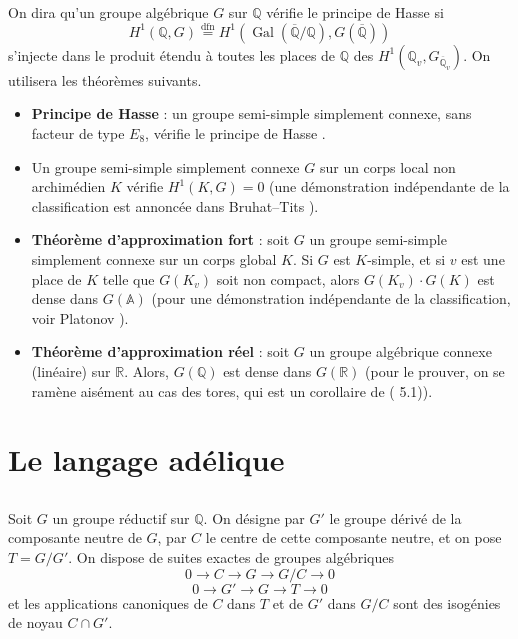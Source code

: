 \documentclass[11pt]{amsart}
\theoremstyle{plain}
\theoremstyle{definition}
\DeclareMathOperator{\Gal}{Gal}
\newcommand{\QQ}{\mathbb{Q}}
\newcommand{\RR}{\mathbb{R}}
\begin{document}
On dira qu'un groupe alg\'ebrique $G$ sur $\QQ$ v\'erifie le principe de Hasse si
\[
H^1(\QQ, G) \overset{\text{dfn}}{=} H^1(\Gal(\overline{\QQ}/\QQ), G(\overline{\QQ}))
\]
s'injecte dans le produit \'etendu \`a toutes les places de $\QQ$ des $H^1(\QQ_v, G_{\overline{\QQ}_v})$. On utilisera les th\'eor\`emes suivants.

\begin{itemize}
\item[(0.1)] \textbf{Principe de Hasse} : un groupe semi-simple simplement connexe, sans facteur de type $E_8$, v\'erifie le principe de Hasse \cite{Ha}.
\end{itemize}

\begin{itemize}
\item[(0.2)] Un groupe semi-simple simplement connexe $G$ sur un corps local non archim\'edien $K$ v\'erifie $H^1(K,G) = 0$ (une d\'emonstration ind\'ependante de la classification est annonc\'ee dans Bruhat--Tits \cite{BT}).
\end{itemize}

\begin{itemize}
\item[(0.3)] \textbf{Th\'eor\`eme d'approximation fort} : soit $G$ un groupe semi-simple simplement connexe sur un corps global $K$. Si $G$ est $K$-simple, et si $v$ est une place de $K$ telle que $G(K_v)$ soit non compact, alors $G(K_v) \cdot G(K)$ est dense dans $G(\mathbb{A})$ (pour une d\'emonstration ind\'ependante de la classification, voir Platonov \cite{Pl}).
\end{itemize}

\begin{itemize}
\item[(0.4)] \textbf{Th\'eor\`eme d'approximation r\'eel} : soit $G$ un groupe alg\'ebrique connexe (lin\'eaire) sur $\RR$. Alors, $G(\QQ)$ est dense dans $G(\RR)$ (pour le prouver, on se ram\`ene ais\'ement au cas des tores, qui est un corollaire de (\cite{Kn} 5.1)).
\end{itemize}

\section{Le langage ad\'elique}

\subsection{}

Soit $G$ un groupe r\'eductif sur $\QQ$. On d\'esigne par $G'$ le groupe d\'eriv\'e de la composante neutre de $G$, par $C$ le centre de cette composante neutre, et on pose $T = G/G'$. On dispose de suites exactes de groupes alg\'ebriques
\begin{equation}\label{eq:1.1.1}
0 \longrightarrow C \longrightarrow G \longrightarrow G/C \longrightarrow 0
\end{equation}
\begin{equation}\label{eq:1.1.2}
0 \longrightarrow G' \longrightarrow G \longrightarrow T \longrightarrow 0
\end{equation}
et les applications canoniques de $C$ dans $T$ et de $G'$ dans $G/C$ sont des isog\'enies de noyau $C \cap G'$.
\end{document}
